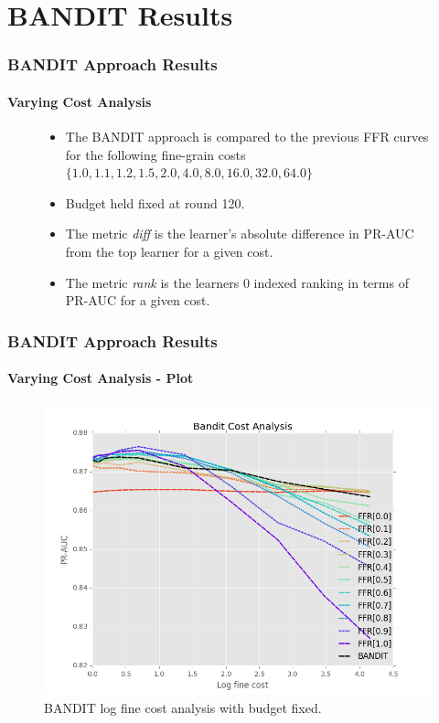 \documentclass{beamer}
\begin{document}
\section{BANDIT Results}
\begin{frame}
    \frametitle{BANDIT Approach Results}
    \framesubtitle{Varying Cost Analysis}
    \begin{figure}[!htb]
        \begin{itemize}
      \item The BANDIT approach is compared to the previous FFR curves for the
      following fine-grain costs $\{1.0, 1.1, 1.2, 1.5, 2.0, 4.0, 8.0, 16.0, 32.0, 64.0\}$
      \item Budget held fixed at round 120.
      \item The metric \textit{diff} is the learner's absolute difference
     in PR-AUC from the top learner for a given cost.
     \item The metric \textit{rank} is the learners
     $0$ indexed ranking in terms of PR-AUC for a given cost.
    \end{itemize}
    \end{figure}
\end{frame}
\begin{frame}
    \frametitle{BANDIT Approach Results}
    \framesubtitle{Varying Cost Analysis - Plot}
    \begin{figure}[!htb]
        \centering
        \includegraphics[width=0.80\columnwidth]{fig/BanditPlotLogFine}
        \caption{BANDIT log fine cost analysis with budget fixed.}
        \label{fig:BanditPlotLogFine}
    \end{figure}
\end{frame}
\end{document}
